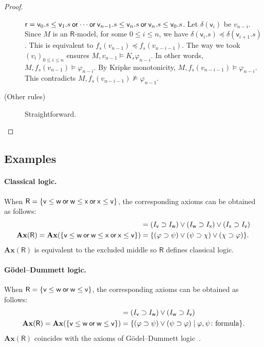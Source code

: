\begin{proof}
\begin{description}
	    $\mathsf r = \mathsf v_0.s\le\mathsf
	    v_1.s\mathbin{\mathsf{or}}\cdots\mathbin{\mathsf{or}}\mathsf v_{n-1}.s\le\mathsf
	    v_n.s\mathbin{\mathsf{or}}\mathsf v_n.s\le\mathsf v_0.s$.
	    Let $\delta(\mathsf v_i)$ be $v_{n-i}$.
	    Since $M$ is an $\mathsf R$-model,
	    for some $0\le i\le n$,
	    we have $\delta(\mathsf v_i.s)\preceq \delta(\mathsf
	    v_{i+1}.s)$.
	    This is equivalent to $f_s(v_{n-1})\preceq f_s(v_{n-i-1})$.
	    The way we took $(v_i)_{0\le i\le n}$ ensures
	    $M,v_{n-1}\models K_s\varphi_{n-i}$.
	    In other words, $M,f_s(v_{n-1})\models \varphi_{n-i}$.
	    By Kripke monotonicity, $M,f_s(v_{n-i-1})\models
	    \varphi_{n-i}$.
	    This contradicts $M,f_s(v_{n-i-1})\not\models\varphi_{n-1}$.
 \item[(Other rules)]
	    Straightforward.
\end{description}
\end{proof}

\subsection{Examples}

\paragraph{Classical logic.}
When
$\mathsf R = \{\mathsf v\le\mathsf w\mathbin{\mathsf{or}}\mathsf w\le\mathsf x\mathbin{\mathsf{or}}\mathsf x\le\mathsf
v\}$,
the corresponding axioms can be obtained as follows:
\begin{align*}
[ \mathsf v\le \mathsf w\wor \mathsf w\le\mathsf x\wor \mathsf x\le\mathsf v ] &=
(I_{\mathsf v}\supset I_{\mathsf w})\vee (I_{\mathsf w}\supset
I_{\mathsf x})\vee (I_{\mathsf x}\supset I_{\mathsf v})
\\
\mathbf{Ax}(\mathsf R) = \mathbf{Ax}(\{\mathsf v\le\mathsf w\wor \mathsf
w\le \mathsf x \wor \mathsf x\le\mathsf v\}) &= \{(\varphi\supset\psi)\vee(\psi\supset\chi)\vee(\chi\supset\varphi)\}.
\end{align*}
$\mathbf{Ax}(\mathsf R)$ is equivalent to the excluded middle so $\mathsf R$ defines
classical logic.

\paragraph{G\"{o}del--Dummett logic.}
When $\mathsf R=\{\mathsf v\le\mathsf w\mathbin{\mathsf{or}}\mathsf w\le\mathsf v\}$,
the corresponding axioms can be obtained as follows:
\begin{align*}
[\mathsf v\le \mathsf w\wor \mathsf w\le\mathsf v] &=
(I_{\mathsf v}\supset I_{\mathsf w})\vee (I_{\mathsf w}\supset
I_{\mathsf v})\\
\mathbf{Ax}(\mathsf R) = \mathbf{Ax}(\{\mathsf v\le\mathsf w\wor \mathsf
w\le \mathsf v\}) &= \{(\varphi\supset\psi)\vee(\psi\supset\varphi)\mid
\varphi,\psi\colon\mbox{formula}\}.
\end{align*}
$\mathbf{Ax}(\mathsf R)$ coincides with the axioms of
G\"{o}del--Dummett logic~\cite{dummett59}.


